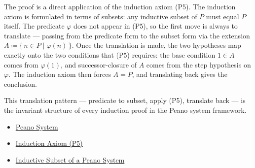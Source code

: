 \begin{remark*}
The proof is a direct application of the induction axiom (P5). The induction
axiom is formulated in terms of subsets: any inductive subset of $P$ must
equal $P$ itself. The predicate $\varphi$ does not appear in (P5), so the
first move is always to translate --- passing from the predicate form to the
subset form via the extension $A \coloneqq \{\,n \in P \mid \varphi(n)\,\}$.
Once the translation is made, the two hypotheses map exactly onto the two
conditions that (P5) requires: the base condition $1 \in A$ comes from
$\varphi(1)$, and successor-closure of $A$ comes from the step hypothesis on
$\varphi$. The induction axiom then forces $A = P$, and translating back gives
the conclusion.

This translation pattern --- predicate to subset, apply (P5), translate back
--- is the invariant structure of every induction proof in the Peano system
framework.
\end{remark*}

\begin{dependencies}
\begin{itemize}
  \item \hyperref[def:peano-system]{Peano System}
  \item \hyperref[ax:peano-induction]{Induction Axiom (P5)}
  \item \hyperref[def:inductive-subset-of-peano-system]{Inductive Subset of a Peano System}
\end{itemize}
\end{dependencies}

